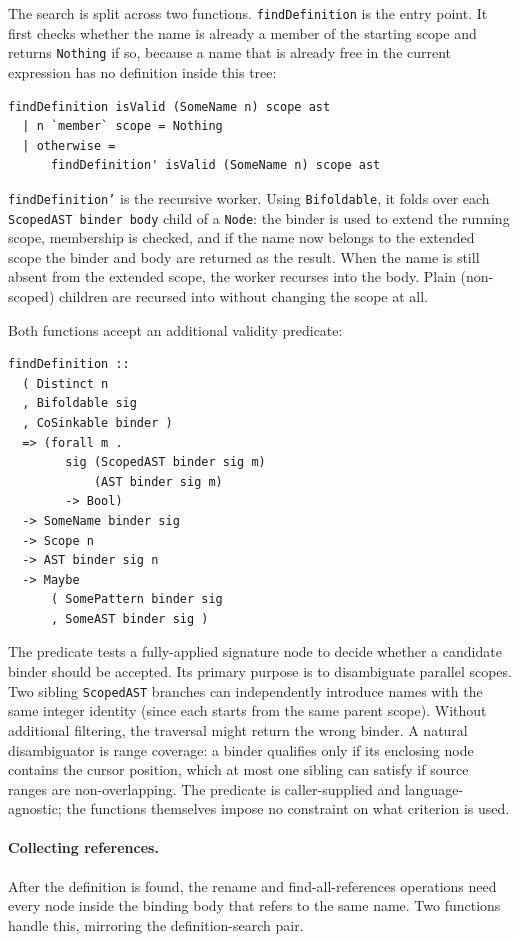 The search is split across two functions.
\texttt{findDefinition} is the entry point.
It first checks whether the name is already a member of the starting scope and returns \texttt{Nothing} if so, because a name that is already free in the current expression has no definition inside this tree:

\begin{verbatim}
findDefinition isValid (SomeName n) scope ast
  | n `member` scope = Nothing
  | otherwise =
      findDefinition' isValid (SomeName n) scope ast
\end{verbatim}

\texttt{findDefinition'} is the recursive worker.
Using \texttt{Bifoldable}, it folds over each \texttt{ScopedAST binder body} child of a \texttt{Node}: the binder is used to extend the running scope, membership is checked, and if the name now belongs to the extended scope the binder and body are returned as the result.
When the name is still absent from the extended scope, the worker recurses into the body.
Plain (non-scoped) children are recursed into without changing the scope at all.

Both functions accept an additional validity predicate:

\begin{verbatim}
findDefinition ::
  ( Distinct n
  , Bifoldable sig
  , CoSinkable binder )
  => (forall m .
        sig (ScopedAST binder sig m)
            (AST binder sig m)
        -> Bool)
  -> SomeName binder sig
  -> Scope n
  -> AST binder sig n
  -> Maybe
      ( SomePattern binder sig
      , SomeAST binder sig )
\end{verbatim}

The predicate tests a fully-applied signature node to decide whether a candidate binder should be accepted.
Its primary purpose is to disambiguate parallel scopes.
Two sibling \texttt{ScopedAST} branches can independently introduce names with the same integer identity (since each starts from the same parent scope).
Without additional filtering, the traversal might return the wrong binder.
A natural disambiguator is range coverage: a binder qualifies only if its enclosing node contains the cursor position, which at most one sibling can satisfy if source ranges are non-overlapping.
The predicate is caller-supplied and language-agnostic; the functions themselves impose no constraint on what criterion is used.

\paragraph{Collecting references.}
After the definition is found, the rename and find-all-references operations need every node inside the binding body that refers to the same name.
Two functions handle this, mirroring the definition-search pair.

